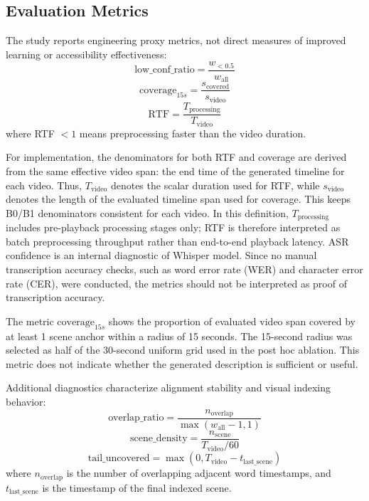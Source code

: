 ﻿\documentclass[conference]{IEEEtran}
\begin{document}
\subsection{Evaluation Metrics}
The study reports engineering proxy metrics, not direct measures of improved learning or accessibility effectiveness:
\begin{equation}
\text{low\_conf\_ratio} = \frac{w_{<0.5}}{w_{\text{all}}}
\end{equation}
\begin{equation}
\text{coverage}_{15s} = \frac{s_{\text{covered}}}{s_{\text{video}}}
\end{equation}
\begin{equation}
\text{RTF} = \frac{T_{\text{processing}}}{T_{\text{video}}}
\end{equation}
where RTF $< 1$ means preprocessing faster than the video duration.

For implementation, the denominators for both RTF and coverage are derived from the same effective video span: the end time of the generated timeline for each video. Thus, $T_{\text{video}}$ denotes the scalar duration used for RTF, while $s_{\text{video}}$ denotes the length of the evaluated timeline span used for coverage. This keeps B0/B1 denominators consistent for each video. In this definition, $T_{\text{processing}}$ includes pre-playback processing stages only; RTF is therefore interpreted as batch preprocessing throughput rather than end-to-end playback latency. ASR confidence is an internal diagnostic of Whisper model. Since no manual transcription accuracy checks, such as word error rate (WER) and character error rate (CER), were conducted, the metrics should not be interpreted as proof of transcription accuracy.

The metric $\text{coverage}_{15s}$ shows the proportion of evaluated video span covered by at least 1 scene anchor within a radius of 15 seconds. The 15-second radius was selected as half of the 30-second uniform grid used in the post hoc ablation. This metric does not indicate whether the generated description is sufficient or useful.

Additional diagnostics characterize alignment stability and visual indexing behavior:
\begin{equation}
\text{overlap\_ratio} = \frac{n_{\text{overlap}}}{\max(w_{\text{all}}-1,1)}
\end{equation}
\begin{equation}
\text{scene\_density} = \frac{n_{\text{scene}}}{T_{\text{video}}/60}
\end{equation}
\begin{equation}
\text{tail\_uncovered} = \max(0, T_{\text{video}} - t_{\text{last\_scene}})
\end{equation}
where $n_{\text{overlap}}$ is the number of overlapping adjacent word timestamps, and $t_{\text{last\_scene}}$ is the timestamp of the final indexed scene.
\end{document}
